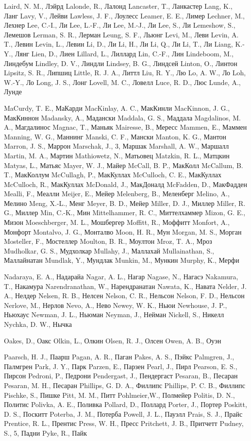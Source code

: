Laird, N. M., Лэйрд
Lalonde, R., Лалонд
Lancaster, T., Ланкастер
Lang, K., Ланг
Lavy, V., Лейви
Lawless, J. F., Лоулесс
Leamer, E. E., Лимер 
Lechner, M., Лехнер
Lee, C.-I., Ли
Lee, L.-F., Ли
Lee, M.-J., Ли
Lee, S., Ли
Lemeshow, S., Лемешов
Lerman, S. R., Лерман 
Leung, S. F., Льюнг
Levi, M., Леви
Levin, A. T., Левин
Levin, L., Левин
Li, D., Ли
Li, H., Ли
Li, Q., Ли
Li, T., Ли 
Liang, K.-Y., Лянг
Lien, D., Лиен
Lillard, L., Лиллард
Lin, C.-F., Лин
Lindeboom, M., Линдебум
Lindley, D. V., Линдли
Lindsey, B. G., Линдсей
Linton, O., Линтон
Lipsitz, S. R., Липшиц
Little, R. J. A., Литтл
Liu, R. Y., Лю
Lo, A. W., Ло
Loh, W.-Y., Ло
Long, J. S., Лонг
Lovell, M. C., Ловелл 
Luce, R. D., Люс
Lunde, A., Лунде

MaCurdy, T. E., МаКарди 
MacKinlay, A. C., МакКинли
MacKinnon, J. G., МакКиннон
Madansky, A., Мадански
Maddala, G. S., Маддала
Magdalinos, M. A., Магдалинос
Magnac, T., Маньяк
Mairesse, B., Мересс
Mammen, E., Маммен
Manning, W. G., Маннинг
Manski, C. F., Мански 
Manton, K. G., Мантон
Marron, J. S., Маррон
Marschak, J., 3, Маршак
Marshall, A. W., Маршалл
Martin, M. A., Мартин
Mathiowetz, N., Матьовец
Matzkin, R. L., Матцкин
Matyas, L., Матьяс
Mayer, W. J., Майер
McCall, B. P., МакКолл
McCallum, B. T., МакКоллум
McCullagh, P., МакКуллах
McCulloch, C. E., МакКуллах
McCulloch, R., МакКуллах
McDonald, J., МакДоналд
McFadden, D., МакФадден  
Mealli, F., Меалли
Meijer, E., Мейер
Melenberg, B., Меленберг
Melino, A., Мелино
Meng, X.-L., Менг
Meyer, B. D., Мейер
Miller, D. J., Миллер
Miller, R. G., Миллер
Min, C.-K., Мин
Mittelhammer, R. C., Миттелхаммер
Mizon, G. E., Мизон
Moeschberger, M. L., Мошбергер
Moffitt, R., Моффитт
Monfort, A., Монфорт 
Montalvo, J. G., Монталво
Moon, H. R., Мун
Morgan, M. S., Морган
Mosteller, F., Мостеллер
Moulton, B. R., Моултон
Mroz, T. A., Мроз 
Mudholkar, G. S., Мудхолкар
Mullahy, J., Маллахай
Mullainathan, S., Маллайнатан
Mundlak, Y., Мундлак
Munkin, M., Мункин
Murphy, K., Мерфи

Nadaraya, E. A., Надарайа
Nagar, A. L., Нагар
Nagase, N., Нагасэ
Nakamura, T., Накамура 
Narendranathan, W., Нарендранатан
Nawata, K., Навата
Nelder, J. A., Нелдер 
Nelsen, R. B., Нелсен
Nelson, C. R., Нельсон
Nelson, F. D., Нельсон
Nerlove, M., Нерлов
Nevo, A., Нево
Newey, W. K., Ньюи
Newhouse, J. P., Ньюхаус
Newman, J. L., Ньюман
Neyman, J., Нейман
Nickell, S., Никелл
Nychka, D. W., Нычка

Oakes, D., Оакс
Olkin, L., Олкин
Olsen, R. J., Олсен
Owen, A. B., Оуэн

Paarsch, H. J., Паарш
Pagan, A. R., Паган
Pakes, A. S., Пэйкс 
Palmgren, J., Палмгрен
Park, J. Y., Парк
Parzen, E., Парзен
Pearl, J., Пирл
Pearson, E. S., Пирсон 
Pedroni, P., Педрони 
Pendergast, J., Пендергаст
Pesaran, B., Песаран
Pesaran, M. H., Песаран 
Phillips, G. D. A., Филлипс
Phillips, P. C. B., Филлипс
Pischke, S., Пишке
Pitt, M. M., Питт
Pohlmeier,W., Полмейер
Politis, D. N., Политис
Polivka, A. E., Поливка
Pollard, D., Поллард
Porter, J., Портер
Poskitt, D. S., Поскитт
Poterba, J. M., Потерба
Powell, J. L., Пауэлл
Prais, S. J., Прайс
Prentice, R. L., Прентис
Press, W. H., Пресс 
Pritchett, J. B., Притчетт
Pudney, S., 5, Падни
Pyke, R., Пайк


